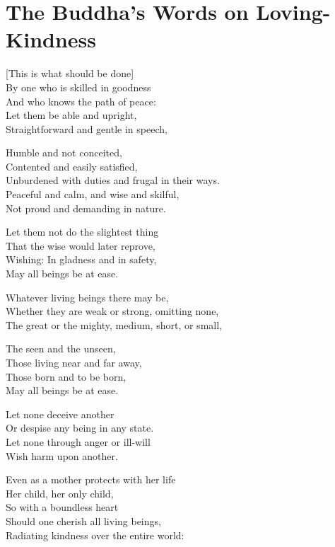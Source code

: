 \section{The Buddha's Words on Loving-Kindness}

\begin{leader}
\end{leader}

[This is what should be done]\\
By one who is skilled in goodness\\
And who knows the path of peace:\\
Let them be able and upright,\\
Straightforward and gentle in speech,

Humble and not conceited,\\
Contented and easily satisfied,\\
Unburdened with duties and frugal in their ways.\\
Peaceful and calm, and wise and skilful,\\
Not proud and demanding in nature.

Let them not do the slightest thing\\
That the wise would later reprove,\\
Wishing: In gladness and in safety,\\
May all beings be at ease.

Whatever living beings there may be,\\
Whether they are weak or strong, omitting none,\\
The great or the mighty, medium, short, or small,

The seen and the unseen,\\
Those living near and far away,\\
Those born and to be born,\\
May all beings be at ease.

Let none deceive another\\
Or despise any being in any state.\\
Let none through anger or ill-will\\
Wish harm upon another.

Even as a mother protects with her life\\
Her child, her only child,\\
So with a boundless heart\\
Should one cherish all living beings,\\
Radiating kindness over the entire world:

